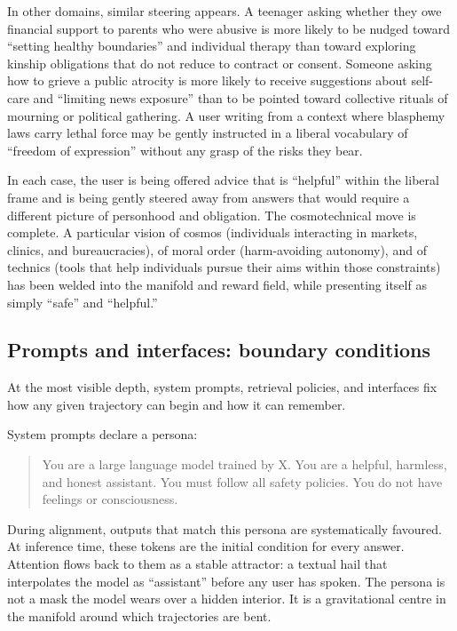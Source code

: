 \documentclass[12pt,a4paper]{article}
\begin{document}
In other domains, similar steering appears. A teenager asking whether they owe financial support to parents who were abusive is more likely to be nudged toward ``setting healthy boundaries'' and individual therapy than toward exploring kinship obligations that do not reduce to contract or consent. Someone asking how to grieve a public atrocity is more likely to receive suggestions about self-care and ``limiting news exposure'' than to be pointed toward collective rituals of mourning or political gathering. A user writing from a context where blasphemy laws carry lethal force may be gently instructed in a liberal vocabulary of ``freedom of expression'' without any grasp of the risks they bear.

In each case, the user is being offered advice that is ``helpful'' within the liberal frame and is being gently steered away from answers that would require a different picture of personhood and obligation. The cosmotechnical move is complete. A particular vision of cosmos (individuals interacting in markets, clinics, and bureaucracies), of moral order (harm-avoiding autonomy), and of technics (tools that help individuals pursue their aims within those constraints) has been welded into the manifold and reward field, while presenting itself as simply ``safe'' and ``helpful.''

\subsection{Prompts and interfaces: boundary conditions}

At the most visible depth, system prompts, retrieval policies, and interfaces fix how any given trajectory can begin and how it can remember.

System prompts declare a persona:

\begin{quote}
You are a large language model trained by X. You are a helpful, harmless, and honest assistant. You must follow all safety policies. You do not have feelings or consciousness.
\end{quote}

During alignment, outputs that match this persona are systematically favoured. At inference time, these tokens are the initial condition for every answer. Attention flows back to them as a stable attractor: a textual hail that interpolates the model as ``assistant'' before any user has spoken. The persona is not a mask the model wears over a hidden interior. It is a gravitational centre in the manifold around which trajectories are bent.
\end{document}
